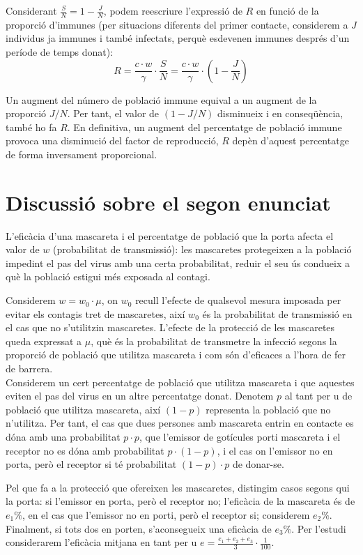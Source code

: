 \documentclass[11pt,a4paper]{article}
\begin{document}
	Considerant $\frac{S}{N}=1-\frac{J}{N}$, podem reescriure l'expressió de $R$ en funció de la proporció d'immunes (per situacions diferents del primer contacte, considerem a $J$ individus ja immunes i també infectats, perquè esdevenen immunes després d'un període de temps donat):
	\[R=\frac{c\cdot w}{\gamma}\cdot \frac{S}{N}=\frac{c\cdot w}{\gamma}\cdot (1-\frac{J}{N})\]
	
	Un augment del número de població immune equival a un augment de la proporció $J/N$. Per tant, el valor de $(1-J/N)$ disminueix i en conseqüència, també ho fa $R$. En definitiva, un augment del percentatge de població immune provoca una disminució del factor de reproducció, $R$ depèn d'aquest percentatge de forma inversament proporcional.
	
	\section{Discussió sobre el segon enunciat}
	L'eficàcia d'una mascareta i el percentatge de població que la porta afecta el valor de $w$ (probabilitat de transmissió): les mascaretes protegeixen a la població impedint el pas del virus amb una certa probabilitat, reduir el seu ús condueix a què la població estigui més exposada al contagi.
	
	Considerem $w=w_0\cdot\mu$, on $w_0$ recull l'efecte de qualsevol mesura imposada per evitar els contagis tret de mascaretes, així $w_0$ és la probabilitat de transmissió en el cas que no s'utilitzin mascaretes. L'efecte de la protecció de les mascaretes queda expressat a $\mu$, què és la probabilitat de transmetre la infecció segons la proporció de població que utilitza mascareta i com són d'eficaces a l'hora de fer de barrera.
	\\
	
	Considerem un cert percentatge de població que utilitza mascareta i que aquestes eviten el pas del virus en un altre percentatge donat. Denotem $p$ al tant per u de població que utilitza mascareta, així $(1-p)$ representa la població que no n'utilitza. Per tant, el cas que dues persones amb mascareta entrin en contacte es dóna amb una probabilitat $p\cdot p$, que l'emissor de gotícules porti mascareta i el receptor no es dóna amb probabilitat $p\cdot (1-p)$, i el cas on l'emissor no en porta, però el receptor si té probabilitat $(1-p)\cdot p$ de donar-se.
	
	Pel que fa a la protecció que ofereixen les mascaretes, distingim casos segons qui la porta: si l'emissor en porta, però el receptor no; l'eficàcia de la mascareta és de $e_1\%$, en el cas que l'emissor no en porti, però el receptor si; considerem $e_2\%$. Finalment, si tots dos en porten, s'aconsegueix una eficàcia de $e_3\%$. Per l'estudi considerarem l'eficàcia mitjana en tant per u $e=\frac{e_1+e_2+e_3}{3}\cdot\frac{1}{100}$.
	
\end{document}

